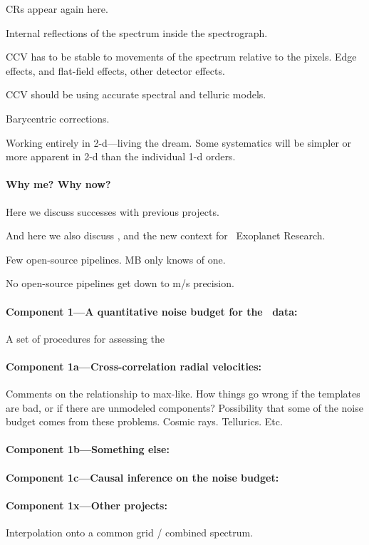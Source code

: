 \documentclass[12pt, fullpage, letterpaper]{article}
\begin{document}
CRs appear again here.

Internal reflections of the spectrum inside the spectrograph.

CCV has to be stable to movements of the spectrum relative to the
pixels. Edge effects, and flat-field effects, other detector effects.

CCV should be using accurate spectral and telluric models.

Barycentric corrections.

Working entirely in 2-d---living the dream. Some systematics will be
simpler or more apparent in 2-d than the individual 1-d orders.

\paragraph{Why me? Why now?}
Here we discuss successes with previous projects.

And here we also discuss \NNEXPLORE, and the new context for
\NASA\ Exoplanet Research.

Few open-source pipelines. MB only knows of one.

No open-source pipelines get down to m/s precision.

\paragraph{Component 1---A quantitative noise budget for the \HARPS\ data:}
A set of procedures for assessing the 

\paragraph{Component 1a---Cross-correlation radial velocities:}
Comments on the relationship to max-like. How things go wrong
if the templates are bad, or if there are unmodeled components?
Possibility that some of the noise budget comes from these
problems. Cosmic rays. Tellurics. Etc.

\paragraph{Component 1b---Something else:}

\paragraph{Component 1c---Causal inference on the noise budget:}

\paragraph{Component 1x---Other projects:}
Interpolation onto a common grid / combined spectrum.
\end{document}
